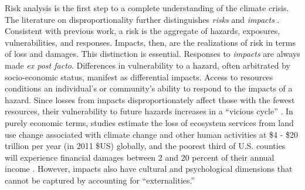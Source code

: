 Risk analysis is the first step to a complete understanding of the climate
crisis. The literature on disproportionality further distinguishes
\textit{risks} and \textit{impacts} \cite{dorkenoo_critical_2022}. Consistent
with previous work, a risk is the aggregate of hazards, exposures,
vulnerabilities, and responses. Impacts, then, are the realizations of risk in
terms of loss and damages. This distinction is essential. Responses to
\textit{impacts} are always made \textit{ex post facto}. Differences in
vulnerability to a hazard, often arbitrated by socio-economic status, manifest
as differential impacts. Access to resources conditions an individual's or
community's ability to respond to the impacts of a hazard. Since losses from
impacts disproportionately affect those with the fewest resources, their
vulnerability to future hazards increases in a ``vicious cycle''
\cite{islam_climate_2017, dorkenoo_critical_2022}. In purely economic terms, studies
estimate the 
loss of ecosystem services from land use change associated with climate change
and other human activities at \$4 - \$20 trillion per year (in 2011
\$US) globally, \cite{costanza_changes_2014} and the poorest third of U.S.
counties will experience financial damages between 2 and 20 percent of their
annual income \cite{hsiang_estimating_2017}. However, impacts also have cultural
and psychological dimensions \cite{dorkenoo_critical_2022} that cannot be
captured by accounting for ``externalities.''



